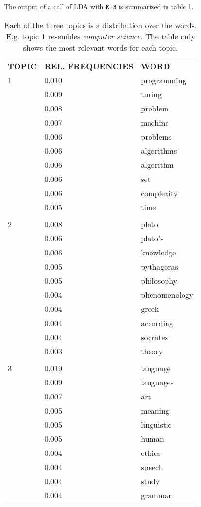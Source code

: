 \documentclass[a4paper,ngerman, english]{atseminar}
\begin{document}
\vspace{1.3cm}

                               
The output of a call of LDA with \texttt{K=3} is summarized in table \ref{table:lda_output}.


\begin{table}[h!]
\caption{Each of the three topics is a distribution over the words. E.g. topic 1 resembles \textit{computer science}.
The table only shows the most relevant words for each topic.}
\label{table:lda_output}
\begin{tabular}{l l l}
\textbf{TOPIC} & \textbf{REL. FREQUENCIES} & \textbf{WORD} \\

1  &   0.010 & programming  \\
    &   0.009 & turing \\
    &   0.008 & problem \\
    &   0.007 & machine \\
    &   0.006 & problems \\
    &   0.006 & algorithms\\
    &   0.006 & algorithm  \\
    &   0.006 & set \\
    &   0.006 & complexity \\ 
    &   0.005 & time  \\
 \hline \\
 2 &  0.008 & plato \\
    &  0.006 & plato's  \\
    &  0.006 & knowledge \\ 
    &  0.005 & pythagoras \\
    &  0.005 & philosophy  \\
    &  0.004 & phenomenology \\
    &  0.004 & greek  \\
    &  0.004 & according  \\ 
    &  0.004 & socrates  \\
    &  0.003 & theory \\
  \hline \\
3 & 0.019 & language \\
   & 0.009 & languages  \\
   & 0.007 & art \\
   & 0.005 & meaning \\ 
   & 0.005 & linguistic \\
   & 0.005 & human \\
   & 0.004 & ethics \\
   & 0.004 & speech \\
   & 0.004 & study \\
   & 0.004 & grammar 
\end{tabular}
\end{table}
\end{document}
